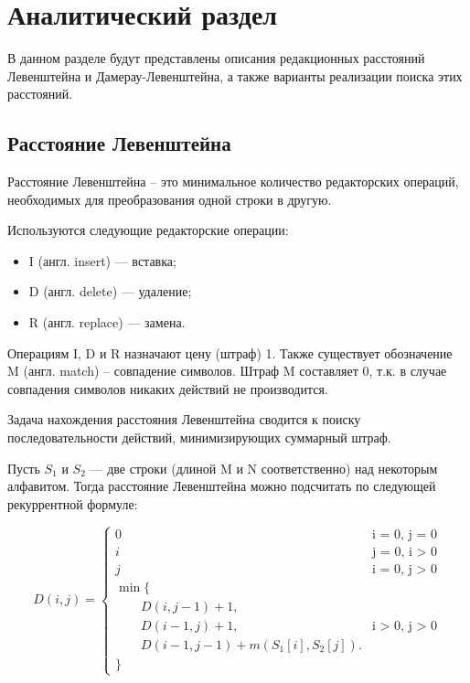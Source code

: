\section{Аналитический раздел \hfill}
\vspace{\baselineskip}

В данном разделе будут представлены описания редакционных расстояний Левенштейна и Дамерау-Левенштейна, а также варианты реализации поиска этих расстояний.

\subsection{Расстояние Левенштейна}

Расстояние Левенштейна \cite{Levenshtein} -- это минимальное количество редакторских операций, необходимых для преобразования одной строки в другую.

Используются следующие редакторские операции:
\begin{itemize}
    \item I (англ. insert) — вставка;
	\item D (англ. delete) — удаление;
	\item R (англ. replace) — замена.
\end{itemize}

Операциям I, D и R назначают цену (штраф) 1. Также существует обозначение M (англ. match) -- совпадение символов. Штраф M составляет 0, т.к. в случае совпадения символов никаких действий не производится.

Задача нахождения расстояния Левенштейна сводится к поиску последовательности действий, минимизирующих суммарный штраф.


Пусть $S_{1}$ и $S_{2}$ — две строки (длиной M и N соответственно) над некоторым алфавитом. Тогда расстояние Левенштейна можно подсчитать по следующей рекуррентной формуле:

\begin{equation}
	\label{eq:D}
	D(i, j) = \begin{cases}
		
		0 &\text{i = 0, j = 0}\\
		i &\text{j = 0, i > 0}\\
		j &\text{i = 0, j > 0}\\
		\min \lbrace \\
		\qquad D(i, j-1) + 1,\\
		\qquad D(i-1, j) + 1, &\text{i > 0, j > 0}\\
		\qquad D(i-1, j-1) + m(S_1[i], S_2[j]).\\
		\rbrace
	\end{cases}
\end{equation}

